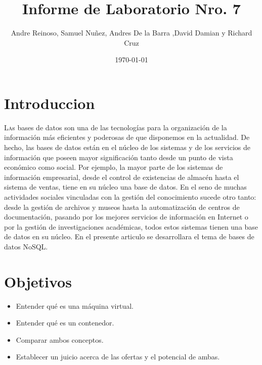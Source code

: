 \documentclass[twoside,twocolumn]{article}
\title{Informe de Laboratorio Nro. 7} %
\author{Andre Reinoso, Samuel Nuñez, Andres De la Barra ,David Damian y Richard Cruz}
\date{\today} %
\begin{document}
\maketitle


\section{Introduccion}
\lettrine[nindent=0em,lines=3]{L}as bases de datos son una de las tecnologías para la organización de la información más eficientes y poderosas de que disponemos en la actualidad. De hecho, las bases de datos están en el núcleo de los sistemas y de los servicios de información que poseen mayor significación tanto desde un punto de vista económico como social. Por ejemplo, la mayor parte de los sistemas de información empresarial, desde el control de existencias de almacén hasta el sistema de ventas, tiene en su núcleo una base de datos. En el seno de muchas actividades sociales vinculadas con la gestión del conocimiento sucede otro tanto: desde la gestión de archivos y museos hasta la automatización de centros de documentación, pasando por los mejores servicios de información en Internet o por la gestión de investigaciones académicas, todos estos sistemas tienen una base de datos en su núcleo. En el presente articulo se desarrollara el tema de bases de datos NoSQL.



\section{Objetivos}

\begin{itemize}
\item Entender qué es una máquina virtual.
\item Entender qué es un contenedor.
\item Comparar ambos conceptos.
\item Establecer un juicio acerca de las ofertas y el potencial de ambas.

\end{itemize}




\end{document}
